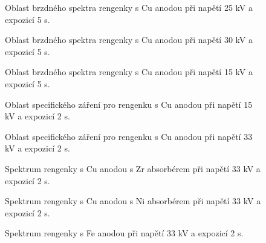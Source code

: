 \documentclass[a4paper,12pt]{article}
\begin{document}
\begin{figure}
\begin{center}

\end{center}
\caption{Oblast brzdného spektra rengenky s Cu anodou při napětí 25 kV a expozicí 5 s.}
\end{figure}

\begin{figure}
\begin{center}

\end{center}
\caption{Oblast brzdného spektra rengenky s Cu anodou při napětí 30 kV a expozicí 5 s.}
\end{figure}

\begin{figure}
\begin{center}

\end{center}
\caption{Oblast brzdného spektra rengenky s Cu anodou při napětí 15 kV a expozicí 5 s.}
\end{figure}

\begin{figure}
\begin{center}

\end{center}
\caption{Oblast specifického záření pro rengenku s Cu anodou při napětí 15 kV a expozicí 2 s.}
\end{figure}

\begin{figure}
\begin{center}

\end{center}
\caption{Oblast specifického záření pro rengenku s Cu anodou při napětí 33 kV a expozicí 2 s.}
\end{figure}

\begin{figure}
\begin{center}

\end{center}
\caption{Spektrum rengenky s Cu anodou s Zr absorbérem při napětí 33 kV a expozicí 2 s.}
\end{figure}
\begin{figure}
\begin{center}

\end{center}
\caption{Spektrum rengenky s Cu anodou s Ni absorbérem při napětí 33 kV a expozicí 2 s.}
\end{figure}

\begin{figure}
\begin{center}

\end{center}
\caption{Spektrum rengenky s Fe anodou při napětí 33 kV a expozicí 2 s.}
\end{figure}
\end{document}
